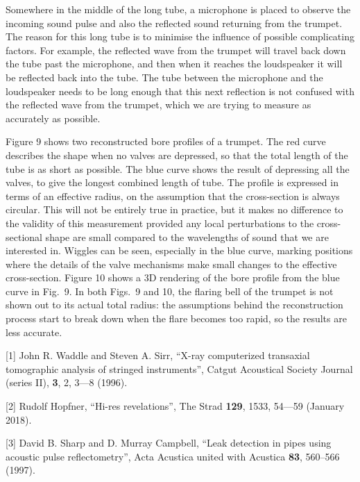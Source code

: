   Somewhere in the middle of the long tube, a microphone is placed to observe 
  the incoming sound pulse and also the reflected sound returning from the 
  trumpet. The reason for this long tube is to minimise the influence of 
  possible complicating factors. For example, the reflected wave from the 
  trumpet will travel back down the tube past the microphone, and then when it 
  reaches the loudspeaker it will be reflected back into the tube. The tube 
  between the microphone and the loudspeaker needs to be long enough that this 
  next reflection is not confused with the reflected wave from the trumpet, 
  which we are trying to measure as accurately as possible. 

  Figure 9 shows two reconstructed bore profiles of a trumpet. The red curve 
  describes the shape when no valves are depressed, so that the total length of 
  the tube is as short as possible. The blue curve shows the result of 
  depressing all the valves, to give the longest combined length of tube. The 
  profile is expressed in terms of an effective radius, on the assumption that 
  the cross-section is always circular. This will not be entirely true in 
  practice, but it makes no difference to the validity of this measurement 
  provided any local perturbations to the cross-sectional shape are small 
  compared to the wavelengths of sound that we are interested in. Wiggles can 
  be seen, especially in the blue curve, marking positions where the details of 
  the valve mechanisms make small changes to the effective cross-section. 
  Figure 10 shows a 3D rendering of the bore profile from the blue curve in 
  Fig.\ 9. In both Figs.\ 9 and 10, the flaring bell of the trumpet is not 
  shown out to its actual total radius: the assumptions behind the 
  reconstruction process start to break down when the flare becomes too rapid, 
  so the results are less accurate. 





  \sectionreferences{}[1] John R. Waddle and Steven A. Sirr, “X-ray 
  computerized transaxial tomographic analysis of stringed instruments”, Catgut 
  Acoustical Society Journal (series II), \textbf{3}, 2, 3—8 (1996). 

  [2] Rudolf Hopfner, “Hi-res revelations”, The Strad \textbf{129}, 1533, 54—59 
  (January 2018). 

  [3] David B. Sharp and D. Murray Campbell, “Leak detection in pipes using 
  acoustic pulse reflectometry”, Acta Acustica united with Acustica 
  \textbf{83}, 560–566 (1997). 